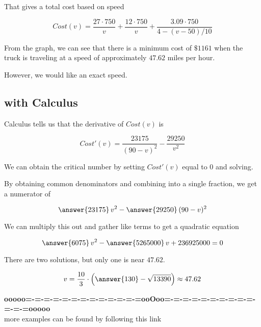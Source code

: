 \documentclass{ximera}
\begin{document}
That gives a total cost based on speed

\[
Cost(v) = \frac{27 \cdot 750}{v} + \frac{12 \cdot 750}{v} + \frac{3.09 \cdot 750}{4-(v-50)/10}
\]





\begin{center}
\end{center}



From the graph, we can see that there is a minimum cost of $\$1161$ when the truck is traveling at a speed of approximately $47.62$ miles per hour.




However, we would like an exact speed. \\






\subsection{with Calculus}

Calculus tells us that the derivative of $Cost(v)$ is


\[
Cost'(v) = \frac{23175}{(90-v)^2} - \frac{29250}{v^2}
\]



We can obtain the critical number by setting $Cost'(v)$ equal to $0$ and solving.


\begin{explanation}
By obtaining common denominators and combining into a single fraction, we get a numerator of

\[
\answer{23175} \, v^2 - \answer{29250} \, (90-v)^2
\]


We can multiply this out and gather like terms to get a quadratic equation

\[
\answer{6075} \, v^2 - \answer{5265000} \, v + 236925000 = 0
\]



There are two solutions, but only one is near $47.62$.


\[
v = \frac{10}{3} \cdot \left( \answer{130} - \sqrt{13390} \right) \approx 47.62
\]


\end{explanation}











\begin{center}
\textbf{\textcolor{green!50!black}{ooooo=-=-=-=-=-=-=-=-=-=-=-=-=ooOoo=-=-=-=-=-=-=-=-=-=-=-=-=ooooo}} \\

more examples can be found by following this link\\ 

\end{center}
\end{document}

